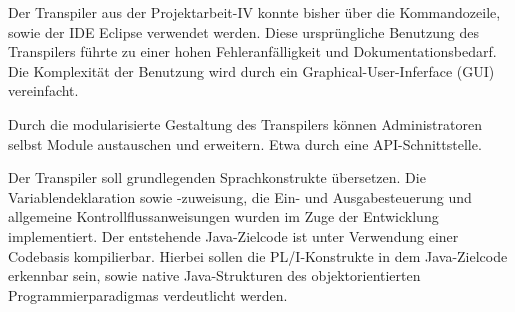 Der Transpiler aus der Projektarbeit-IV konnte bisher über die Kommandozeile, sowie der IDE Eclipse verwendet werden. Diese ursprüngliche Benutzung des Transpilers führte zu einer hohen Fehleranfälligkeit und Dokumentationsbedarf. Die Komplexität der Benutzung wird durch ein Graphical-User-Inferface (GUI) vereinfacht.

Durch die modularisierte Gestaltung des Transpilers können Administratoren selbst Module austauschen und erweitern. 
Etwa durch eine API-Schnittstelle. 


Der Transpiler soll grundlegenden Sprachkonstrukte übersetzen. Die Variablendeklaration sowie -zuweisung, die Ein- und Ausgabesteuerung und allgemeine Kontrollflussanweisungen wurden im Zuge der Entwicklung implementiert. Der entstehende Java-Zielcode ist unter Verwendung einer Codebasis kompilierbar. Hierbei sollen die  PL/I-Konstrukte in dem Java-Zielcode erkennbar sein, sowie native Java-Strukturen des objektorientierten Programmierparadigmas verdeutlicht werden.

%
	
 
    \pagebreak

